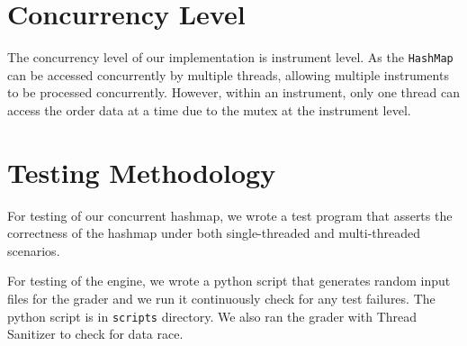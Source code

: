 \documentclass[11pt]{article}
\begin{document}


\section{Concurrency Level}\label{sec:Concurrency Level} %

The concurrency level of our implementation is instrument level. As the \verb|HashMap| can be
accessed concurrently by multiple threads, allowing multiple instruments to be processed
concurrently. However, within an instrument, only one thread can access the order data at a time
due to the mutex at the instrument level.


\section{Testing Methodology}\label{sec:Testing Methodology} %

For testing of our concurrent hashmap, we wrote a test program that asserts the correctness of the
hashmap under both single-threaded and multi-threaded scenarios.

For testing of the engine, we wrote a python script that generates random input files for the grader and we run it
continuously check for any test failures. The python script is in \texttt{scripts} directory. We also ran the grader with Thread Sanitizer to check for data race.

\end{document}
